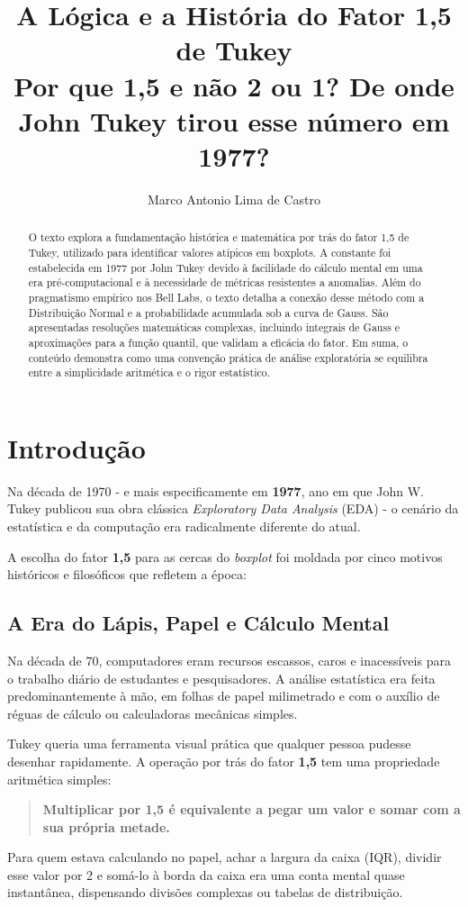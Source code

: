\documentclass[12pt,a4paper]{article}
\title{\vspace{-2cm}\textbf{A Lógica e a História do Fator 1,5 de Tukey}\\ \large Por que 1,5 e não 2 ou 1? De onde John Tukey tirou esse número em 1977?}
\author{Marco Antonio Lima de Castro}
\date{}
\begin{document}
\maketitle

\begin{abstract}
O texto explora a fundamentação histórica e matemática por trás do fator 1,5 de Tukey, utilizado para identificar valores atípicos em boxplots. A constante foi estabelecida em 1977 por John Tukey devido à facilidade do cálculo mental em uma era pré-computacional e à necessidade de métricas resistentes a anomalias. Além do pragmatismo empírico nos Bell Labs, o texto detalha a conexão desse método com a Distribuição Normal e a probabilidade acumulada sob a curva de Gauss. São apresentadas resoluções matemáticas complexas, incluindo integrais de Gauss e aproximações para a função quantil, que validam a eficácia do fator. Em suma, o conteúdo demonstra como uma convenção prática de análise exploratória se equilibra entre a simplicidade aritmética e o rigor estatístico.
\end{abstract}

\section{Introdução}
Na década de 1970 - e mais especificamente em \textbf{1977}, ano em que John W. Tukey publicou sua obra clássica \textit{Exploratory Data Analysis} (EDA) - o cenário da estatística e da computação era radicalmente diferente do atual.

A escolha do fator \textbf{1,5} para as cercas do \textit{boxplot} foi moldada por cinco motivos históricos e filosóficos que refletem a época:

\subsection{A Era do Lápis, Papel e Cálculo Mental}
Na década de 70, computadores eram recursos escassos, caros e inacessíveis para o trabalho diário de estudantes e pesquisadores. A análise estatística era feita predominantemente à mão, em folhas de papel milimetrado e com o auxílio de réguas de cálculo ou calculadoras mecânicas simples.

Tukey queria uma ferramenta visual prática que qualquer pessoa pudesse desenhar rapidamente. A operação por trás do fator \textbf{1,5} tem uma propriedade aritmética simples:
\begin{quote}
\textbf{Multiplicar por 1,5 é equivalente a pegar um valor e somar com a sua própria metade.}
\end{quote}
Para quem estava calculando no papel, achar a largura da caixa (IQR), dividir esse valor por 2 e somá-lo à borda da caixa era uma conta mental quase instantânea, dispensando divisões complexas ou tabelas de distribuição.
\end{document}
